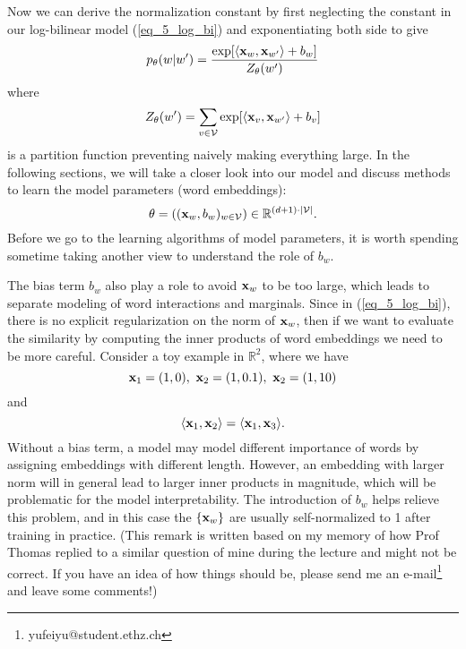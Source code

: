 \documentclass[../book-template.tex]{subfiles}
\begin{document}
\par Now we can derive the normalization constant by first neglecting the constant in our log-bilinear model (\ref{eq_5_log_bi}) and exponentiating both side to give
\begin{equation*}
	p_{\theta}(w|w')=\frac{\exp[\langle {\bf x}_w,{\bf x}_{w'}\rangle + b_w]}{Z_{\theta}(w')}
\end{equation*}
where
\begin{equation*}
	Z_{\theta}(w')= \sum_{v\in \mathcal{V}} \exp[\langle {\bf x}_v,{\bf x}_{w'}\rangle + b_v]
\end{equation*}
is a partition function preventing naively making everything large. In the following sections, we will take a closer look into our model and discuss methods to learn the model parameters (word embeddings):
\begin{equation*}
	\theta = (({\bf x}_w,b_w)_{w\in \mathcal{V}})\in \mathbb{R}^{(d+1)\cdot |\mathcal{V}|}.
\end{equation*}
Before we go to the learning algorithms of model parameters, it is worth spending sometime taking another view to understand the role of $b_w$.
\begin{remark}
	The bias term $b_w$ also play a role to avoid ${\bf x}_w$ to be too large, which leads to separate modeling of word interactions and marginals. Since in (\ref{eq_5_log_bi}), there is no explicit regularization on the norm of ${\bf x}_w$, then if we want to evaluate the similarity by computing the inner products of word embeddings we need to be more careful. Consider a toy example in $\mathbb{R}^2$, where we have
	\begin{equation*}
		{\bf x}_1 =(1, 0),\ {\bf x}_2=(1,0.1),\ {\bf x}_2=(1,10)
	\end{equation*}
	and 
	\begin{equation*}
		\langle {\bf x}_1,{\bf x}_2\rangle = \langle {\bf x}_1,{\bf x}_3\rangle.
	\end{equation*}
	Without a bias term, a model may model different importance of words by assigning embeddings with different length. However, an embedding with larger norm will in general lead to larger inner products in magnitude, which will be problematic for the model interpretability. The introduction of $b_w$ helps relieve this problem, and in this case the $\{{\bf x}_w\}$ are usually self-normalized to 1 after training in practice. (This remark is written based on my memory of how Prof Thomas replied to a similar question of mine during the lecture and might not be correct. If you have an idea of how things should be, please send me an e-mail\footnote{yufeiyu@student.ethz.ch} and leave some comments!)
\end{remark}
\end{document}
